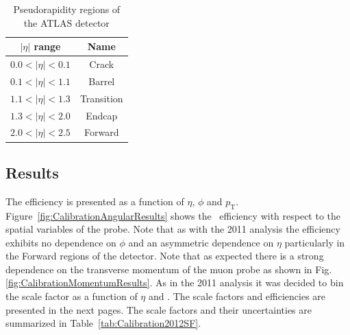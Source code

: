 \begin{table}[thbp]
  \centering
  \caption{Pseudorapidity regions of the ATLAS detector} \label{tab:CalibrationEtaRegions}
  \begin{tabular}{|c|c|}
    \hline 
    $|\eta|$ range & Name \\ \hline \hline
    $0.0<|\eta|<0.1$ & Crack \\
    $0.1<|\eta|<1.1$ & Barrel \\
    $1.1<|\eta|<1.3$ & Transition \\
    $1.3<|\eta|<2.0$ & Endcap \\
    $2.0<|\eta|<2.5$ & Forward \\
    \hline
  \end{tabular}
\end{table}

\subsection{Results}

The efficiency is presented as a function of $\eta$, $\phi$ and $p_{\textrm{T}}$. Figure~\ref{fig:CalibrationAngularResults} shows the \xsm\ efficiency with respect to the spatial variables of the probe. Note that as with the 2011 analysis the efficiency exhibits no dependence on $\phi$ and an asymmetric dependence on $\eta$ particularly in the Forward regions of the detector. Note that as expected there is a strong dependence on the transverse momentum of the muon probe as shown in Fig.\ref{fig:CalibrationMomentumResults}. As in the 2011 analysis it was decided to bin the scale factor as a function of $\eta$ and \pt. The scale factors and efficiencies are presented in the next pages. The scale factors and their uncertainties are summarized in Table~\ref{tab:Calibration2012SF}.

